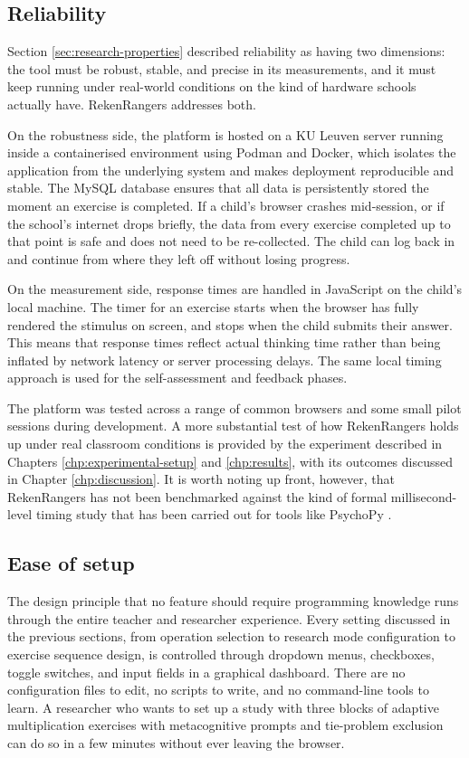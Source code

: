 \subsection{Reliability}
Section \ref{sec:research-properties} described reliability as having two dimensions: the tool must be robust, stable, and precise in its measurements, and it must keep running under real-world conditions on the kind of hardware schools actually have. RekenRangers addresses both.

On the robustness side, the platform is hosted on a KU Leuven server running inside a containerised environment using Podman and Docker, which isolates the application from the underlying system and makes deployment reproducible and stable. The MySQL database ensures that all data is persistently stored the moment an exercise is completed. If a child's browser crashes mid-session, or if the school's internet drops briefly, the data from every exercise completed up to that point is safe and does not need to be re-collected. The child can log back in and continue from where they left off without losing progress.

On the measurement side, response times are handled in JavaScript on the child's local machine. The timer for an exercise starts when the browser has fully rendered the stimulus on screen, and stops when the child submits their answer. This means that response times reflect actual thinking time rather than being inflated by network latency or server processing delays. The same local timing approach is used for the self-assessment and feedback phases.

The platform was tested across a range of common browsers and some small pilot sessions during development. A more substantial test of how RekenRangers holds up under real classroom conditions is provided by the experiment described in Chapters \ref{chp:experimental-setup} and \ref{chp:results}, with its outcomes discussed in Chapter \ref{chp:discussion}. It is worth noting up front, however, that RekenRangers has not been benchmarked against the kind of formal millisecond-level timing study that has been carried out for tools like PsychoPy \cite{bridges2020timing}.

\subsection{Ease of setup}
The design principle that no feature should require programming knowledge runs through the entire teacher and researcher experience. Every setting discussed in the previous sections, from operation selection to research mode configuration to exercise sequence design, is controlled through dropdown menus, checkboxes, toggle switches, and input fields in a graphical dashboard. There are no configuration files to edit, no scripts to write, and no command-line tools to learn. A researcher who wants to set up a study with three blocks of adaptive multiplication exercises with metacognitive prompts and tie-problem exclusion can do so in a few minutes without ever leaving the browser.

